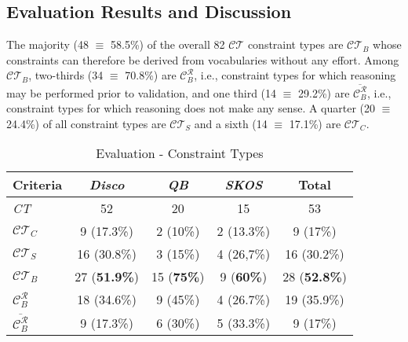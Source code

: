 \documentclass{llncs}
\begin{document}
{\subsection{Evaluation Results and Discussion}

The majority (48 $\equiv$ 58.5\%) of the overall 82 $\mathcal{CT}$ constraint types are $\mathcal{CT}_{B}$ whose constraints can therefore be derived from vocabularies without any effort.
Among $\mathcal{CT}_{B}$, two-thirds (34 $\equiv$ 70.8\%) are $\mathcal{C}_B ^{\mathcal{R}}$, i.e., constraint types for which reasoning may be performed prior to validation, and one third (14 $\equiv$ 29.2\%) are $\overline{\mathcal{C}_B ^{\mathcal{R}}}$, i.e., constraint types for which reasoning does not make any sense.
A quarter (20 $\equiv$ 24.4\%) of all constraint types are $\mathcal{CT}_{S}$ and a sixth (14 $\equiv$ 17.1\%) are $\mathcal{CT}_{C}$.

\begin{table}[H]
		\scriptsize
    \begin{center}
    \begin{tabular}{@{}lcccc@{}}
    \\       \textbf{Criteria}
           & \textbf{\emph{Disco}}
           & \textbf{\emph{QB}}
					 & \textbf{\emph{SKOS}}
					 & \textbf{Total}
    \\ \midrule
		\emph{CT} & 52 & 20 & 15 & 53 \\
		\hline
		$\mathcal{CT}_{C}$ & 9 (17.3\%) & 2 (10\%) & 2 (13.3\%) & 9 (17\%) \\
		$\mathcal{CT}_{S}$ & 16 (30.8\%) & 3 (15\%) & 4 (26,7\%) & 16 (30.2\%) \\
		$\mathcal{CT}_{B}$ & 27 (\textbf{51.9\%}) & 15 (\textbf{75\%}) & 9 (\textbf{60\%}) & 28 (\textbf{52.8\%}) \\
		\hline
		$\mathcal{C}_B ^{\mathcal{R}}$ & 18 (34.6\%) & 9 (45\%) & 4 (26.7\%) & 19 (35.9\%) \\
		$\overline{\mathcal{C}_B ^{\mathcal{R}}}$ & 9 (17.3\%) & 6 (30\%) & 5 (33.3\%) & 9 (17\%) \\
    \bottomrule
    \end{tabular}
    \caption{Evaluation - Constraint Types}
		\label{tab:evaluation-constraint-types}
    \end{center}
\end{table}

}
\end{document}
